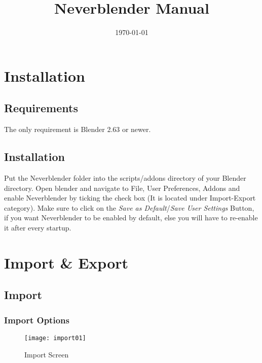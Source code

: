 \documentclass[a4paper]{article}
\begin{document}
\title{Neverblender Manual}

\date{\today}

\maketitle
\tableofcontents

\section{Installation}

\subsection{Requirements}
The only requirement is Blender 2.63 or newer.

\subsection{Installation}
Put the Neverblender folder into the scripts/addons directory of your Blender directory. Open blender and navigate to File, User Preferences, Addons and enable Neverblender by ticking the check box (It is located under Import-Export category). Make sure to click on the {\textit{Save as Default}}/{\textit{Save User Settings}} Button, if you want Neverblender to be enabled by default, else you will have to re-enable it after every startup.


\section{Import \& Export}

\subsection{Import}

\subsubsection*{Import Options}

\begin{figure}
  \centering
  \texttt{[image: import01]}
  \caption[mdl import]{Import Screen}
  \label{fig:import01}
\end{figure}
\end{document}
